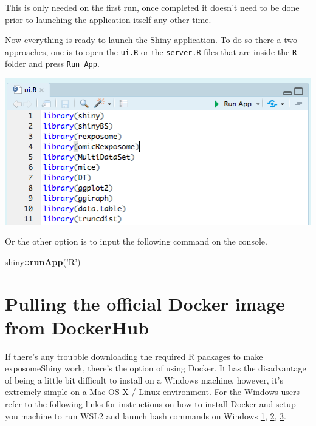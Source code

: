 \documentclass[
]{book}
\newenvironment{Shaded}{\begin{snugshade}}{\end{snugshade}}
\newcommand{\KeywordTok}[1]{\textcolor[rgb]{0.13,0.29,0.53}{\textbf{#1}}}
\newcommand{\NormalTok}[1]{#1}
\newcommand{\OperatorTok}[1]{\textcolor[rgb]{0.81,0.36,0.00}{\textbf{#1}}}
\newcommand{\StringTok}[1]{\textcolor[rgb]{0.31,0.60,0.02}{#1}}
\begin{document}
This is only needed on the first run, once completed it doesn't need to be done prior to launching the application itself any other time.

Now everything is ready to launch the Shiny application. To do so there a two approaches, one is to open the \texttt{ui.R} or the \texttt{server.R} files that are inside the \texttt{R} folder and press \texttt{Run\ App}.

\includegraphics{images/setup2.png}

Or the other option is to input the following command on the console.

\begin{Shaded}
\begin{Highlighting}[]
\NormalTok{shiny}\OperatorTok{::}\KeywordTok{runApp}\NormalTok{(}\StringTok{'R'}\NormalTok{)}
\end{Highlighting}
\end{Shaded}

\hypertarget{pulling-the-official-docker-image-from-dockerhub}{%
\section{Pulling the official Docker image from DockerHub}\label{pulling-the-official-docker-image-from-dockerhub}}

If there's any troubble downloading the required R packages to make exposomeShiny work, there's the option of using Docker. It has the disadvantage of being a little bit difficult to install on a Windows machine, however, it's extremely simple on a Mac OS X / Linux environment. For the Windows users refer to the following links for instructions on how to install Docker and setup you machine to run WSL2 and launch bash commands on Windows \href{https://docs.docker.com/docker-for-windows/install-windows-home/}{1}, \href{https://blog.nillsf.com/index.php/2020/02/17/setting-up-wsl2-windows-terminal-and-oh-my-zsh/}{2}, \href{https://docs.docker.com/docker-for-windows/wsl/}{3}.
\end{document}
